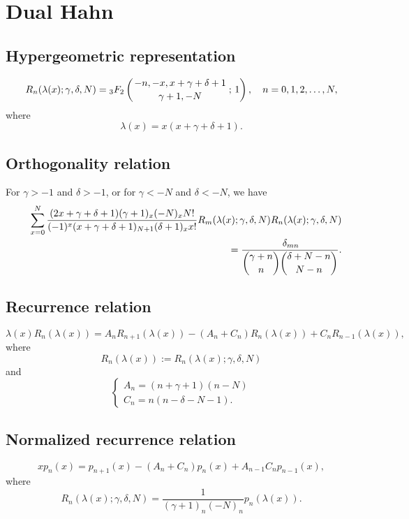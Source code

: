 \documentclass[envcountchap,graybox]{svmono}
\newcommand{\hyp}[5]{\mbox{}_{#1}{F}_{#2}
\left(\genfrac{}{}{0pt}{}{#3}{#4}\,;\,#5\right)}
\begin{document}
\section{Dual Hahn}

\par\setcounter{equation}{0}

\subsection*{Hypergeometric representation}
\begin{equation}
\label{DefDualHahn}
R_n(\lambda(x);\gamma,\delta,N)=
\hyp{3}{2}{-n,-x,x+\gamma+\delta+1}{\gamma+1,-N}{1},\quad n=0,1,2,\ldots,N,
\end{equation}
where
$$\lambda(x)=x(x+\gamma+\delta+1).$$

\subsection*{Orthogonality relation}
For $\gamma>-1$ and $\delta>-1$, or for $\gamma<-N$ and $\delta<-N$, we have
\begin{eqnarray}
\label{OrtDualHahn}
& &\sum_{x=0}^N\frac{(2x+\gamma+\delta+1)(\gamma+1)_x(-N)_xN!}{(-1)^x(x+\gamma+\delta+1)_{N+1}(\delta+1)_xx!}
R_m(\lambda(x);\gamma,\delta,N)R_n(\lambda(x);\gamma,\delta,N)\nonumber\\
& &{}=\frac{\,\delta_{mn}}{\dbinom{\gamma+n}{n}\dbinom{\delta+N-n}{N-n}}.
\end{eqnarray}

\subsection*{Recurrence relation}
\begin{equation}
\label{RecDualHahn}
\lambda(x)R_n(\lambda(x))
=A_nR_{n+1}(\lambda(x))-\left(A_n+C_n\right)R_n(\lambda(x))+C_nR_{n-1}(\lambda(x)),
\end{equation}
where
$$R_n(\lambda(x)):=R_n(\lambda(x);\gamma,\delta,N)$$
and
$$\left\{\begin{array}{l}
\displaystyle A_n=(n+\gamma+1)(n-N)\\[5mm]
\displaystyle C_n=n(n-\delta-N-1).
\end{array}\right.$$

\subsection*{Normalized recurrence relation}
\begin{equation}
\label{NormRecDualHahn}
xp_n(x)=p_{n+1}(x)-(A_n+C_n)p_n(x)+A_{n-1}C_np_{n-1}(x),
\end{equation}
where
$$R_n(\lambda(x);\gamma,\delta,N)=\frac{1}{(\gamma+1)_n(-N)_n}p_n(\lambda(x)).$$
\end{document}

